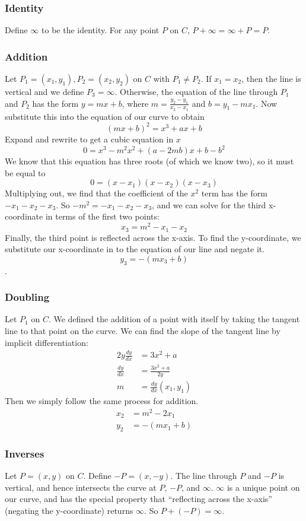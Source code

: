 \documentclass{article}
\begin{document}
\subsubsection{Identity}
Define $\infty$ to be the identity. For any point $P$ on $C$, $P+\infty = \infty + P = P$.

\subsubsection{Addition}
Let $P_1 = (x_1,y_1), P_2 = (x_2,y_2)$ on $C$ with $P_1 \neq P_2$.
If $x_1 = x_2$, then the line is vertical and we define $P_3 = \infty$.
Otherwise, the equation of the line through $P_1$ and $P_2$ has the form $y = mx + b$, where $m = \frac{y_2-y_1}{x_2-x_1}$ and $b = y_1 - mx_1$.
Now substitute this into the equation of our curve to obtain
$$(mx+b)^2 = x^3 + ax + b$$
Expand and rewrite to get a cubic equation in $x$
$$0 = x^3 - m^2x^2 + (a-2mb)x + b - b^2$$
We know that this equation has three roots (of which we know two), so it must be equal to
$$0 = (x-x_1)(x-x_2)(x-x_3)$$
Multiplying out, we find that the coefficient of the $x^2$ term has the form $-x_1 - x_2 - x_3$. So $-m^2 = -x_1 - x_2 - x_3$, and we can solve for the third x-coordinate in terms of the first two points:
$$x_3 = m^2 - x_1 - x_2$$
Finally, the third point is reflected across the x-axis.
To find the y-coordinate, we substitute our x-coordinate in to the equation of our line and negate it.
$$y_3 = -(mx_3 + b)$$.

\subsubsection{Doubling}
Let $P_1$ on $C$.
We defined the addition of a point with itself by taking the tangent line to that point on the curve.
We can find the slope of the tangent line by implicit differentiation:
\begin{align*}
2y \frac{dy}{dx} &= 3x^2 + a \\
\frac{dy}{dx} &= \frac{3x^2+a}{2y} \\
m &= \frac{dy}{dx}(x_1,y_1) 
\end{align*}
Then we simply follow the same process for addition.
\begin{align*}
x_2 &= m^2 - 2x_1 \\
y_2 &= -(mx_1 + b)
\end{align*}

\subsubsection{Inverses}
Let $P=(x,y)$ on $C$. Define $-P = (x,-y)$.
The line through $P$ and $-P$ is vertical, and hence intersects the curve at $P$, $-P$, and $\infty$.
$\infty$ is a unique point on our curve, and has the special property that ``reflecting across the x-axis'' (negating the y-coordinate) returns $\infty$.
So $P + (-P) = \infty$.
\end{document}

